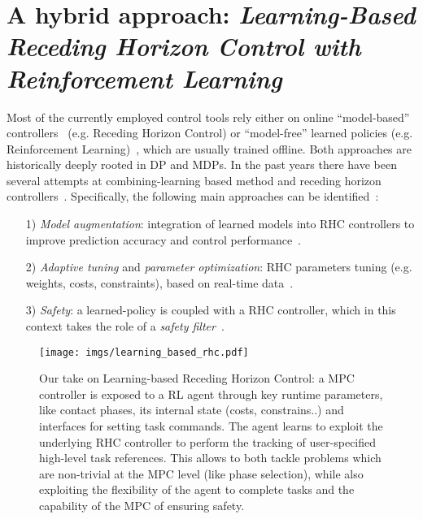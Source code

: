 \section{A hybrid approach: \textnormal{\textit{Learning-Based Receding Horizon Control with Reinforcement Learning}}}
Most of the currently employed control tools rely either on online ``model-based'' controllers~\cite{modern_mpc:neunert2018whole,web::atlas_grip_boston_dyn} (e.g. Receding Horizon Control) or ``model-free'' learned policies (e.g. Reinforcement Learning)~\cite{mpc_learn:aswani2012provably, mpc_learn:terzi2018learning, mpc_learn:soloperto2018learning, rl:schneider2023learning, rl:miki2024learning,mpc_learn:berkenkamp2016safe,mpc_learn:marco2016automatic,mpc_learn:brunner2015stabilizing,mpc_learn:rosolia2019learning,mpc_learn:englert2017inverse,mpc_learn:koller2018learning,mpc_learn:wabersich2021probabilistic,mpc_learn:gillulay2011guaranteed,mpc_learn:wabersich2018safe,mpc_learn:berkenkamp2017safe}, which are usually trained offline. Both approaches are historically deeply rooted in DP and MDPs. 
In the past years there have been several attempts at combining-learning based method and receding horizon controllers~\cite{mpc_learn:tsounis2020deepgait,mpc_learn:gangapurwala2021real}. Specifically, the following main approaches can be identified~\cite{mpc_learn:hewing2020learning}:
\begin{itemize}
	\item[1)] \textit{Model augmentation}: integration of learned models into RHC controllers to improve prediction accuracy and control performance~\cite{mpc_learn:aswani2012provably,mpc_learn:terzi2018learning,mpc_learn:soloperto2018learning}.
	\item[2)] \textit{Adaptive tuning} and \textit{parameter optimization}: RHC parameters tuning (e.g. weights, costs, constraints), based on real-time data~\cite{mpc_learn:berkenkamp2016safe,mpc_learn:marco2016automatic,mpc_learn:brunner2015stabilizing,mpc_learn:rosolia2019learning,mpc_learn:englert2017inverse}.
	\item[3)] \textit{Safety}: a learned-policy is coupled with a RHC controller, which in this context takes the role of a \textit{safety filter}~\cite{mpc_learn:koller2018learning,mpc_learn:wabersich2021probabilistic,mpc_learn:gillulay2011guaranteed,mpc_learn:wabersich2018safe,mpc_learn:berkenkamp2017safe}.
\end{itemize}

\begin{figure*}[t]
	\centering
	\vspace{0.1cm}
	\texttt{[image: imgs/learning\_based\_rhc.pdf]}
	\caption{Our take on Learning-based Receding Horizon Control: a MPC controller is exposed to a RL agent through key runtime parameters, like contact phases, its internal state (costs, constrains..) and interfaces for setting task commands. The agent learns to exploit the underlying RHC controller to perform the tracking of user-specified high-level task references. This allows to both tackle problems which are non-trivial at the MPC level (like phase selection), while also exploiting the flexibility of the agent to complete tasks and the capability of the MPC of ensuring safety.}
	\label{fig:lrhc_arch}
\end{figure*}
